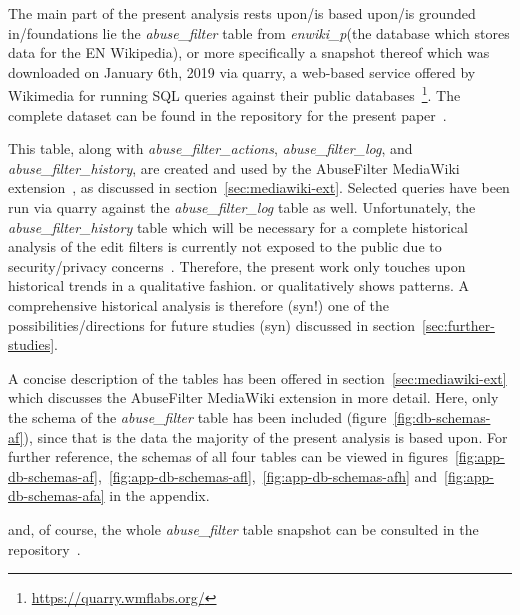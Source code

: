 The main part of the present analysis rests upon/is based upon/is grounded in/foundations lie the \emph{abuse\_filter} table from \emph{enwiki\_p}(the database which stores data for the EN Wikipedia), or more specifically a snapshot thereof which was downloaded on January 6th, 2019 via quarry, a web-based service offered by Wikimedia for running SQL queries against their public databases~\footnote{\url{https://quarry.wmflabs.org/}}.
The complete dataset can be found in the repository for the present paper~\cite{github}. %

This table, along with \emph{abuse\_filter\_actions}, \emph{abuse\_filter\_log}, and \emph{abuse\_filter\_history}, are created and used by the AbuseFilter MediaWiki extension~\cite{gerrit-abusefilter-tables}, as discussed in section~\ref{sec:mediawiki-ext}.
Selected queries have been run via quarry against the \emph{abuse\_filter\_log} table as well.
Unfortunately, the \emph{abuse\_filter\_history} table which will be necessary for a complete historical analysis of the edit filters is currently not exposed to the public due to security/privacy concerns~\cite{phabricator}.
Therefore, the present work only touches upon historical trends in a qualitative fashion. %
or qualitatively shows patterns.
A comprehensive historical analysis is therefore (syn!) one of the possibilities/directions for future studies (syn) discussed in section~\ref{sec:further-studies}.

A concise description of the tables has been offered in section~\ref{sec:mediawiki-ext} which discusses the AbuseFilter MediaWiki extension in more detail.
Here, only the schema of the \emph{abuse\_filter} table has been included (figure~\ref{fig:db-schemas-af}), since that is the data the majority of the present analysis is based upon.
For further reference, the schemas of all four tables can be viewed in figures~\ref{fig:app-db-schemas-af},~\ref{fig:app-db-schemas-afl},~\ref{fig:app-db-schemas-afh} and~\ref{fig:app-db-schemas-afa} in the appendix.

and, of course, the whole \emph{abuse\_filter} table snapshot can be consulted in the repository~\cite{github}.

